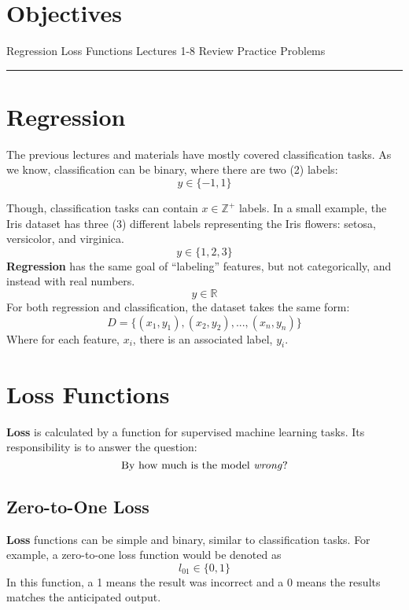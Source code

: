 
\section*{Objectives}
\begin{outline}
    \1 Regression
    \1 Loss Functions
    \1 Lectures 1-8 Review
    \1 Practice Problems
\end{outline}

\rule[0.0051in]{\textwidth}{0.00025in}


\section{Regression}
The previous lectures and materials have mostly covered classification tasks. As we know, classification can be binary, where there are two (2) labels: 
\[
y \in \{-1, 1\}
\]

Though, classification tasks can contain $x\mathbb{\in Z^+}$ labels. In a small example, the Iris dataset has three (3) different labels representing the Iris flowers: setosa, versicolor, and virginica.
\[
y \in \{1, 2, 3\}
\]
\textbf{Regression} has the same goal of ``labeling'' features, but not categorically, and instead with real numbers.
\[
y \in \mathbb{R}
\]
For both regression and classification, the dataset takes the same form:
\[
D = \{(x_1, y_1), (x_2, y_2),...,(x_n, y_n)\}
\]
Where for each feature, $x_i$, there is an associated label, $y_i$.
\section{Loss Functions}
\textbf{Loss} is calculated by a function for supervised machine learning tasks. Its responsibility is to answer the question: 
\[
\text{By how much is the model \textit{wrong}?}
\]

\subsection{Zero-to-One Loss}
\textbf{Loss} functions can be simple and binary, similar to classification tasks. For example, a zero-to-one loss function would be denoted as
\[
l_{01} \in \{0, 1\}
\]
In this function, a 1 means the result was incorrect and a 0 means the results matches the anticipated output.

